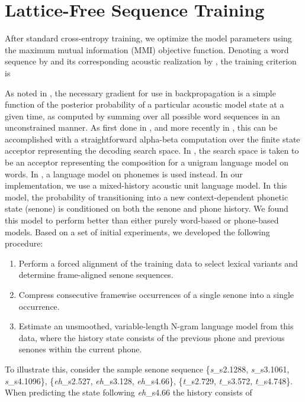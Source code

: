 \documentclass{article}
\begin{document}
\section{Lattice-Free Sequence Training}
\label{sec:lfmmi}
After standard cross-entropy training, we optimize the model parameters using
the maximum mutual information (MMI) objective function. Denoting a word sequence by  and its 
corresponding acoustic realization by , the training criterion is

As noted in \cite{sim2010sequential,vesely2013sequence},
the necessary gradient for use in backpropagation is a simple function 
of the posterior probability of a  particular acoustic model state at a given
time, as computed by summing over all possible word sequences in an 
unconstrained manner.  As first done in \cite{chen2006advances},  and more
recently in \cite{povey2016purely}, this can be accomplished with a 
straightforward alpha-beta computation over the finite state acceptor 
representing the decoding search space. In \cite{chen2006advances}, the 
search space is taken to be an acceptor representing the composition  for a 
unigram language model  on words.
In \cite{povey2016purely}, a language model on phonemes is used instead.
In our implementation, we use a mixed-history acoustic unit language model.
In this model, the probability of transitioning into a new context-dependent phonetic state (senone)
is conditioned on both the senone and phone history.
We found this model to perform better than either purely word-based or phone-based models.
Based on a set of initial experiments, we developed the following procedure:
\begin{enumerate}
\item Perform a forced alignment of the training data to select 
lexical variants and determine frame-aligned senone sequences.
\item Compress consecutive framewise occurrences of a single senone into a single occurrence. 
\item Estimate an unsmoothed, variable-length N-gram language model from this data, where the history state consists of the previous phone and previous senones within the current phone.
\end{enumerate}
\newcommand{\phone}[1]{{\it #1}}
\newcommand{\state}[2]{{\it #1}\_s#2}
To illustrate this, consider the sample senone sequence
\{\state{s}{2.1288}, \state{s}{3.1061}, \state{s}{4.1096}\},
\{\state{eh}{2.527}, \state{eh}{3.128}, \state{eh}{4.66}\},
\{\state{t}{2.729}, \state{t}{3.572}, \state{t}{4.748}\}.
When predicting the state following \state{eh}{4.66} the history consists of
\end{document}
